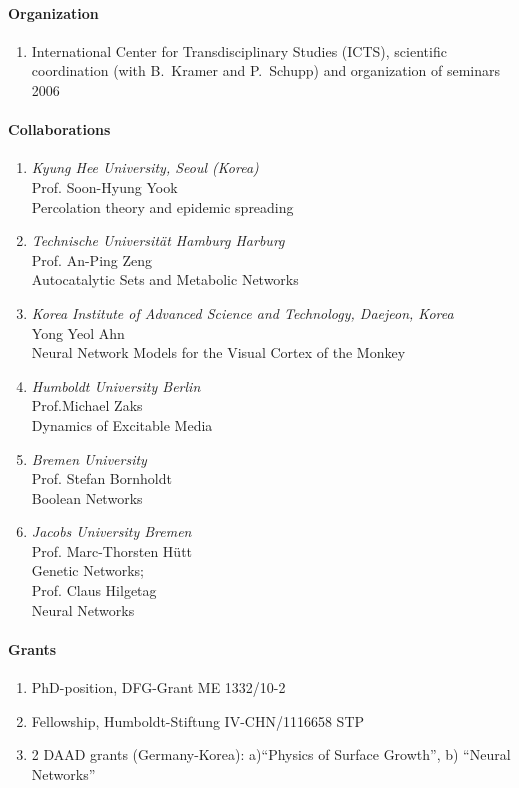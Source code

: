 \paragraph{Organization}

\begin{enumerate}
\item  International Center for Transdisciplinary Studies (ICTS),
scientific coordination (with B.\ Kramer and P.\ Schupp) and
organization of seminars 2006
\end{enumerate}

\paragraph{Collaborations}
\begin{enumerate}
\item {\sl Kyung Hee University, Seoul (Korea)}\\ Prof. Soon-Hyung
Yook\\ Percolation theory and epidemic spreading
\item  {\sl Technische Universit\"at Hamburg Harburg}\\ Prof. An-Ping Zeng\\
Autocatalytic Sets and Metabolic Networks \item{\sl Korea
Institute of Advanced Science and Technology, Daejeon,
Korea}\\Yong Yeol Ahn\\ Neural Network Models for the Visual
Cortex of the Monkey
\item{\sl Humboldt University Berlin}\\Prof.Michael Zaks\\
Dynamics of Excitable Media \item {\sl Bremen University} \\Prof.
Stefan Bornholdt\\Boolean Networks
\item {\sl Jacobs University Bremen}\\
Prof. Marc-Thorsten H\"utt\\Genetic
Networks; \\Prof. Claus Hilgetag\\Neural Networks
\end{enumerate}


\paragraph{Grants}
\begin{enumerate}
\item PhD-position, DFG-Grant ME 1332/10-2
\item Fellowship, Humboldt-Stiftung IV-CHN/1116658 STP
\item 2 DAAD grants (Germany-Korea): a)``Physics of Surface Growth'', b) ``Neural
  Networks''  
\end{enumerate}



